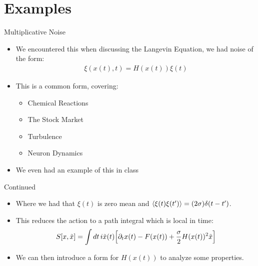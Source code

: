 \documentclass{beamer}
\def\D{\partial}
\begin{document}
\section{Examples}
\begin{frame}{Multiplicative Noise}
  \begin{itemize}
  \item We encountered this when discussing the Langevin Equation, we had noise of the form:
    \begin{align*}
      \xi(x(t),t)=H(x(t))\xi(t)
    \end{align*}
  \item This is a common form, covering:
    \begin{itemize}
    \item Chemical Reactions
    \item The Stock Market
    \item Turbulence
    \item Neuron Dynamics
    \end{itemize}
  \item We even had an example of this in class
  \end{itemize}
\end{frame}

\begin{frame}{Continued}
  \begin{itemize}
  \item Where we had that $\xi(t)$ is zero mean and $\ev{\xi(t)\xi(t')}=(2\sigma)\delta(t-t')$. 
  \item This reduces the action to a path integral which is local in time:
    \begin{align*}
      S[x,\tilde{x}]=\int\dd{t}i\tilde{x}(t)\qty[\D_t x(t)-F(x(t))+\frac\sigma2H(x(t))^2\tilde{x}]
    \end{align*}
  \item We can then introduce a form for $H(x(t))$ to analyze some properties.
  \end{itemize}
\end{frame}
\end{document}
